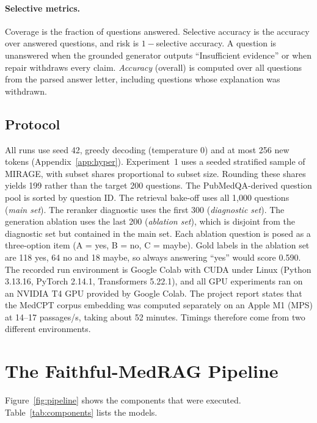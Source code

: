 \documentclass[11pt]{article}
\begin{document}
\paragraph{Selective metrics.} Coverage is the fraction of questions answered. Selective accuracy is the accuracy over answered questions, and risk is $1-$selective accuracy. A question is unanswered when the grounded generator outputs ``Insufficient evidence'' or when repair withdraws every claim. \emph{Accuracy} (overall) is computed over all questions from the parsed answer letter, including questions whose explanation was withdrawn.

\subsection{Protocol}
All runs use seed 42, greedy decoding (temperature 0) and at most 256 new tokens (Appendix~\ref{app:hyper}). Experiment~1 uses a seeded stratified sample of MIRAGE, with subset shares proportional to subset size. Rounding these shares yields 199 rather than the target 200 questions. %
The PubMedQA-derived question pool is sorted by question ID. The retrieval bake-off uses all 1,000 questions (\emph{main set}). The reranker diagnostic uses the first 300 (\emph{diagnostic set}). The generation ablation uses the last 200 (\emph{ablation set}), which is disjoint from the diagnostic set but contained in the main set. Each ablation question is posed as a three-option item (A = yes, B = no, C = maybe). %
Gold labels in the ablation set are 118 yes, 64 no and 18 maybe, so always answering ``yes'' would score 0.590. %
The recorded run environment is Google Colab with CUDA under Linux (Python 3.13.16, PyTorch 2.14.1, Transformers 5.22.1), and all GPU experiments ran on an NVIDIA T4 GPU provided by Google Colab. The project report states that the MedCPT corpus embedding was computed separately on an Apple M1 (MPS) at 14--17 passages/s, taking about 52 minutes. Timings therefore come from two different environments. %

\section{The Faithful-MedRAG Pipeline}
Figure~\ref{fig:pipeline} shows the components that were executed. Table~\ref{tab:components} lists the models.
\end{document}
